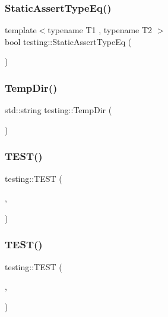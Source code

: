 \mbox{\label{namespacetesting_a661e70fc6afeb5c085eed3716aa45059}} 
\subsubsection{\texorpdfstring{StaticAssertTypeEq()}{StaticAssertTypeEq()}}
{\footnotesize\ttfamily template$<$typename T1 , typename T2 $>$ \\
bool testing\+::\+Static\+Assert\+Type\+Eq (\begin{DoxyParamCaption}{ }\end{DoxyParamCaption})}

\mbox{\label{namespacetesting_aae1bbe7c3cc99bf56263d51d3982a52e}} 
\subsubsection{\texorpdfstring{TempDir()}{TempDir()}}
{\footnotesize\ttfamily std\+::string testing\+::\+Temp\+Dir (\begin{DoxyParamCaption}{ }\end{DoxyParamCaption})}

\mbox{\label{namespacetesting_af4187d1b48a2812f1335721ed8f30a99}} 
\subsubsection{\texorpdfstring{TEST()}{TEST()}\hspace{0.1cm}{\footnotesize\ttfamily [1/7]}}
{\footnotesize\ttfamily testing\+::\+T\+E\+ST (\begin{DoxyParamCaption}\item[{G\+Test\+Env\+Var\+Test}]{,  }\item[{Dummy}]{ }\end{DoxyParamCaption})}

\mbox{\label{namespacetesting_ae0cbea692840c88ab0b03285eb69ac97}} 
\subsubsection{\texorpdfstring{TEST()}{TEST()}\hspace{0.1cm}{\footnotesize\ttfamily [2/7]}}
{\footnotesize\ttfamily testing\+::\+T\+E\+ST (\begin{DoxyParamCaption}\item[{Successful\+Assertion\+Test}]{,  }\item[{\mbox{\hyperlink{gtest_8h_a75adcdf89f69b0b615e395daafc315af}{S\+U\+C\+C\+E\+ED}}}]{ }\end{DoxyParamCaption})}

